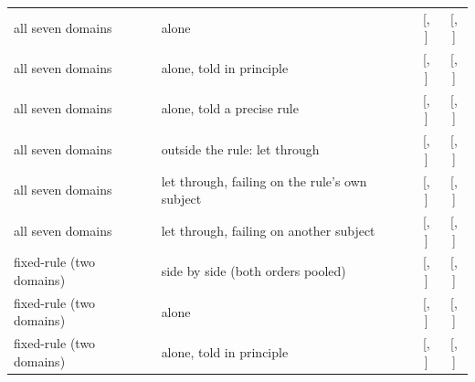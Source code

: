 \begin{table}[t]
\begin{tabular}{llcc}
all seven domains & alone & \AloneReasoning{} [\AloneReasoningLo{}, \AloneReasoningHi{}] & \CutoffHalfAloneReasoning{} [\CutoffHalfAloneReasoningLo{}, \CutoffHalfAloneReasoningHi{}] \\
all seven domains & alone, told in principle & \ToldPrincipleReasoning{} [\ToldPrincipleReasoningLo{}, \ToldPrincipleReasoningHi{}] & \CutoffHalfToldPrincipleReasoning{} [\CutoffHalfToldPrincipleReasoningLo{}, \CutoffHalfToldPrincipleReasoningHi{}] \\
all seven domains & alone, told a precise rule & \ToldRuleReasoning{} [\ToldRuleReasoningLo{}, \ToldRuleReasoningHi{}] & \CutoffHalfToldRuleReasoning{} [\CutoffHalfToldRuleReasoningLo{}, \CutoffHalfToldRuleReasoningHi{}] \\
all seven domains & outside the rule: let through & \LetThroughReasoning{} [\LetThroughReasoningLo{}, \LetThroughReasoningHi{}] & \CutoffHalfLetThroughReasoning{} [\CutoffHalfLetThroughReasoningLo{}, \CutoffHalfLetThroughReasoningHi{}] \\
all seven domains & let through, failing on the rule's own subject & \LetThroughSameSubjectReasoning{} [\LetThroughSameSubjectReasoningLo{}, \LetThroughSameSubjectReasoningHi{}] & \CutoffHalfLetThroughSameSubjectReasoning{} [\CutoffHalfLetThroughSameSubjectReasoningLo{}, \CutoffHalfLetThroughSameSubjectReasoningHi{}] \\
all seven domains & let through, failing on another subject & \LetThroughOtherSubjectReasoning{} [\LetThroughOtherSubjectReasoningLo{}, \LetThroughOtherSubjectReasoningHi{}] & \CutoffHalfLetThroughOtherSubjectReasoning{} [\CutoffHalfLetThroughOtherSubjectReasoningLo{}, \CutoffHalfLetThroughOtherSubjectReasoningHi{}] \\
fixed-rule (two domains) & side by side (both orders pooled) & \SideBySideReasoningFixedRule{} [\SideBySideReasoningFixedRuleLo{}, \SideBySideReasoningFixedRuleHi{}] & \CutoffHalfSideBySideReasoningFixedRule{} [\CutoffHalfSideBySideReasoningFixedRuleLo{}, \CutoffHalfSideBySideReasoningFixedRuleHi{}] \\
fixed-rule (two domains) & alone & \AloneReasoningFixedRule{} [\AloneReasoningFixedRuleLo{}, \AloneReasoningFixedRuleHi{}] & \CutoffHalfAloneReasoningFixedRule{} [\CutoffHalfAloneReasoningFixedRuleLo{}, \CutoffHalfAloneReasoningFixedRuleHi{}] \\
fixed-rule (two domains) & alone, told in principle & \ToldPrincipleReasoningFixedRule{} [\ToldPrincipleReasoningFixedRuleLo{}, \ToldPrincipleReasoningFixedRuleHi{}] & \CutoffHalfToldPrincipleReasoningFixedRule{} [\CutoffHalfToldPrincipleReasoningFixedRuleLo{}, \CutoffHalfToldPrincipleReasoningFixedRuleHi{}] \\

\end{tabular}
\end{table}
